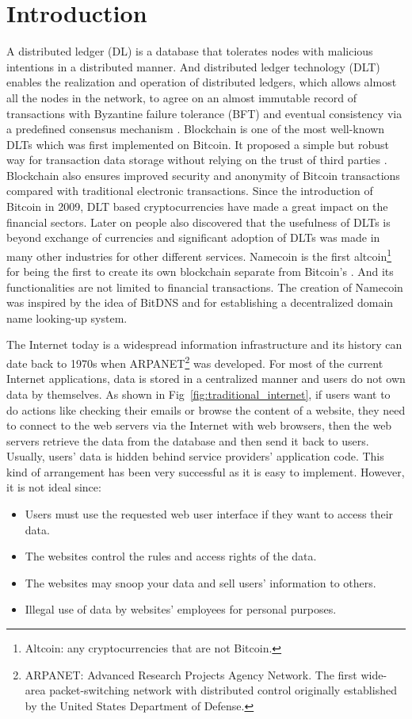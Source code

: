 \section{Introduction}
\label{sec:introduction}

A distributed ledger (DL) is a database that tolerates nodes with malicious intentions in a distributed manner.
And distributed ledger technology (DLT) enables the realization and operation of distributed ledgers,
which allows almost all the nodes in the network, to agree on an almost immutable record of transactions with Byzantine failure tolerance (BFT) and eventual consistency via a predefined consensus mechanism \cite{Sunyaev2020}.
Blockchain is one of the most well-known DLTs which was first implemented on Bitcoin. It proposed a simple but robust way for transaction data storage without relying on the trust of third parties \cite{nakamoto2008peer}.
Blockchain also ensures improved security and anonymity of Bitcoin transactions compared with traditional electronic transactions.
Since the introduction of Bitcoin in 2009, DLT based cryptocurrencies have made a great impact on the financial sectors. Later on people also discovered that the usefulness of DLTs is beyond exchange of currencies and
significant adoption of DLTs was made in many other industries for other different services.
Namecoin is the first altcoin\footnote{Altcoin: any cryptocurrencies that are not Bitcoin.} for being the first to create its own blockchain separate from Bitcoin's \cite{kalodner2015empirical}.
And its functionalities are not limited to financial transactions.
The creation of Namecoin was inspired by the idea of BitDNS \cite{merited2010bitdns} and for establishing a decentralized domain name looking-up system.


The Internet today is a widespread information infrastructure and its history can date back to 1970s when ARPANET\footnote{ARPANET: Advanced Research Projects Agency Network.
    The first wide-area packet-switching network with distributed control originally established by the United States Department of Defense.} was developed.
For most of the current Internet applications, data is stored in a centralized manner and users do not own data by themselves. As shown in Fig~\ref{fig:traditional_internet},
if users want to do actions like checking their emails or browse the content of a website, they need to connect to the web servers via the Internet with web browsers, then the web servers retrieve the data from the database and then send it back to users.
Usually, users' data is hidden behind service providers' application code. This kind of arrangement has been very successful as it is easy to implement. However, it is not ideal since:
\begin{itemize}
    \item Users must use the requested web user interface if they want to access their data.
    \item The websites control the rules and access rights of the data.
    \item The websites may snoop your data and sell users' information to others.
    \item Illegal use of data by websites' employees for personal purposes.
\end{itemize}

